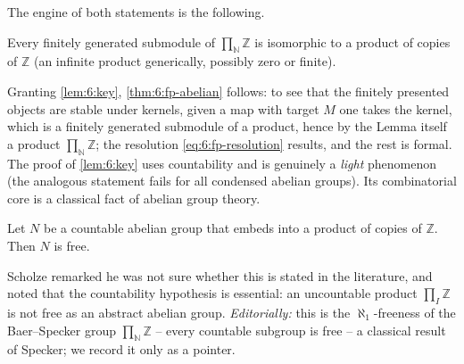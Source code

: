 The engine of both statements is the following.

\begin{lemma}
\label{lem:6:key}
Every finitely generated submodule of $\prod_{\mathbb{N}}\mathbb{Z}$ is isomorphic
to a product of copies of $\mathbb{Z}$ (an infinite product generically, possibly
zero or finite).
\end{lemma}

Granting \cref{lem:6:key}, \cref{thm:6:fp-abelian} follows: to see that the
finitely presented objects are stable under kernels, given a map with target $M$
one takes the kernel, which is a finitely generated submodule of a product, hence
by the Lemma itself a product $\prod_{\mathbb{N}}\mathbb{Z}$; the resolution
\eqref{eq:6:fp-resolution} results, and the rest is formal. The proof of
\cref{lem:6:key} uses countability and is genuinely a \emph{light} phenomenon
(the analogous statement fails for all condensed abelian groups). Its
combinatorial core is a classical fact of abelian group theory.

\begin{lemma}
\label{lem:6:free-fact}
Let $N$ be a countable abelian group that embeds into a product of copies of
$\mathbb{Z}$. Then $N$ is free.
\end{lemma}

\begin{remark}
\label{rmk:6:baer-specker}
Scholze remarked he was not sure whether this is stated in the literature, and
noted that the countability hypothesis is essential: an uncountable product
$\prod_{I}\mathbb{Z}$ is not free as an abstract abelian group.
\emph{Editorially:} this is the $\aleph_{1}$-freeness of the Baer--Specker group
$\prod_{\mathbb{N}}\mathbb{Z}$ -- every countable subgroup is free -- a classical
result of Specker; we record it only as a pointer.
\end{remark}

